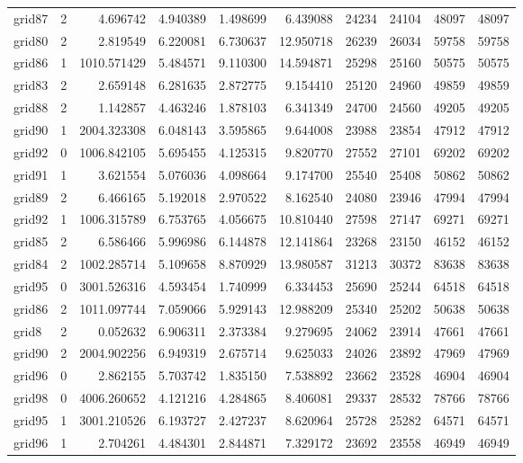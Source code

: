 \begin{longtable}{|l|r|r|r|r|r|r|r|r|r|}
grid87 & 2 & 4.696742 & 4.940389 & 1.498699 & 6.439088 & 24234 & 24104 & 48097 & 48097 \\
grid80 & 2 & 2.819549 & 6.220081 & 6.730637 & 12.950718 & 26239 & 26034 & 59758 & 59758 \\
grid86 & 1 & 1010.571429 & 5.484571 & 9.110300 & 14.594871 & 25298 & 25160 & 50575 & 50575 \\
grid83 & 2 & 2.659148 & 6.281635 & 2.872775 & 9.154410 & 25120 & 24960 & 49859 & 49859 \\
grid88 & 2 & 1.142857 & 4.463246 & 1.878103 & 6.341349 & 24700 & 24560 & 49205 & 49205 \\
grid90 & 1 & 2004.323308 & 6.048143 & 3.595865 & 9.644008 & 23988 & 23854 & 47912 & 47912 \\
grid92 & 0 & 1006.842105 & 5.695455 & 4.125315 & 9.820770 & 27552 & 27101 & 69202 & 69202 \\
grid91 & 1 & 3.621554 & 5.076036 & 4.098664 & 9.174700 & 25540 & 25408 & 50862 & 50862 \\
grid89 & 2 & 6.466165 & 5.192018 & 2.970522 & 8.162540 & 24080 & 23946 & 47994 & 47994 \\
grid92 & 1 & 1006.315789 & 6.753765 & 4.056675 & 10.810440 & 27598 & 27147 & 69271 & 69271 \\
grid85 & 2 & 6.586466 & 5.996986 & 6.144878 & 12.141864 & 23268 & 23150 & 46152 & 46152 \\
grid84 & 2 & 1002.285714 & 5.109658 & 8.870929 & 13.980587 & 31213 & 30372 & 83638 & 83638 \\
grid95 & 0 & 3001.526316 & 4.593454 & 1.740999 & 6.334453 & 25690 & 25244 & 64518 & 64518 \\
grid86 & 2 & 1011.097744 & 7.059066 & 5.929143 & 12.988209 & 25340 & 25202 & 50638 & 50638 \\
grid8 & 2 & 0.052632 & 6.906311 & 2.373384 & 9.279695 & 24062 & 23914 & 47661 & 47661 \\
grid90 & 2 & 2004.902256 & 6.949319 & 2.675714 & 9.625033 & 24026 & 23892 & 47969 & 47969 \\
grid96 & 0 & 2.862155 & 5.703742 & 1.835150 & 7.538892 & 23662 & 23528 & 46904 & 46904 \\
grid98 & 0 & 4006.260652 & 4.121216 & 4.284865 & 8.406081 & 29337 & 28532 & 78766 & 78766 \\
grid95 & 1 & 3001.210526 & 6.193727 & 2.427237 & 8.620964 & 25728 & 25282 & 64571 & 64571 \\
grid96 & 1 & 2.704261 & 4.484301 & 2.844871 & 7.329172 & 23692 & 23558 & 46949 & 46949 \\

\end{longtable}
